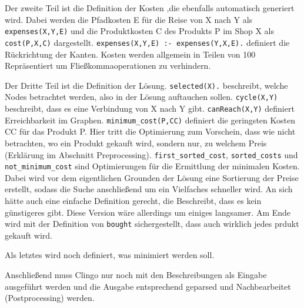 Der zweite Teil ist die Definition der Kosten ,die ebenfalls automatisch generiert wird. Dabei werden die Pfadkosten E für die Reise von X nach Y als \texttt{expenses(X,Y,E)} und die Produktkosten C des Produkts P im Shop X als \texttt{cost(P,X,C)} dargestellt. \texttt{expenses(X,Y,E) :- expenses(Y,X,E).} definiert die Rückrichtung der Kanten. Kosten werden allgemein in Teilen von 100 Repräsentiert um Fließkommaoperationen zu verhindern. 



Der Dritte Teil ist die Definition der Lösung. \texttt{selected(X).} beschreibt, welche Nodes betrachtet werden, also in der Lösung auftauchen sollen. \texttt{cycle(X,Y)} beschreibt, dass es eine Verbindung von X nach Y gibt. \texttt{canReach(X,Y)} definiert Erreichbarkeit im Graphen. \texttt{minimum\_cost(P,CC)} definiert die geringsten Kosten CC für das Produkt P. Hier tritt die Optimierung zum Vorschein, dass wie nicht betrachten, wo ein Produkt gekauft wird, sondern nur, zu welchem Preis (Erklärung im Abschnitt Preprocessing). \texttt{first\_sorted\_cost}, \texttt{sorted\_costs} und \texttt{not\_minimum\_cost} sind Optimierungen für die Ermittlung der minimalen Kosten. Dabei wird vor dem eigentlichen Grounden der Lösung eine Sortierung der Preise erstellt, sodass die Suche anschließend um ein Vielfaches schneller wird. An sich hätte auch eine einfache Definition gerecht, die Beschreibt, dass es kein günstigeres gibt. Diese Version wäre allerdings um einiges langsamer. Am Ende wird mit der Definition von \texttt{bought} sichergestellt, dass auch wirklich jedes prdukt gekauft wird. 



Als letztes wird noch definiert, was minimiert werden soll.



Anschließend muss Clingo nur noch mit den Beschreibungen als Eingabe ausgeführt werden und die Ausgabe entsprechend geparsed und Nachbearbeitet (Postprocessing) werden.

